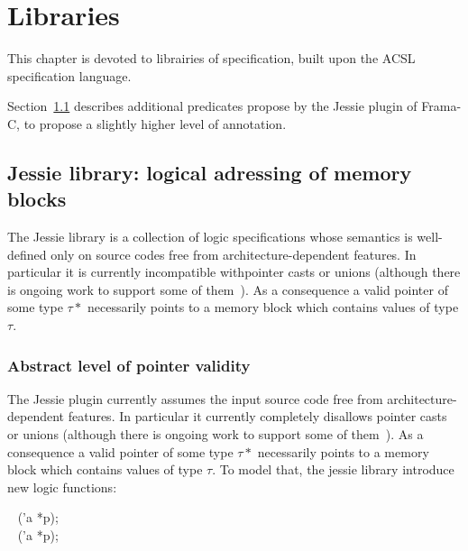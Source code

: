 \chapter{Libraries}
\label{chap:lib}

This chapter is devoted to librairies of specification, built upon the ACSL specification language.

Section~\ref{sec:jessie} describes additional predicates propose by the Jessie plugin of Frama-C, to propose a slightly higher level of annotation.


%

\section{Jessie library: logical adressing of memory blocks}
\label{sec:jessie}


The Jessie library is a collection of logic specifications whose
semantics is well-defined only on source codes free from
architecture-dependent features. In particular it is currently
incompatible withpointer casts or unions (although there is ongoing
work to support some of them~\cite{moy07ccpp}). As a consequence a
valid pointer of some type $\tau*$ necessarily points to a memory
block which contains values of type $\tau$.

\subsection{Abstract level of pointer validity}

The Jessie plugin currently assumes the input source code free from
architecture-dependent features. In particular it currently completely
disallows pointer casts or unions (although there is ongoing work to
support some of them~\cite{moy07ccpp}). As a consequence a valid
pointer of some type $\tau*$ necessarily points to a memory block
which contains values of type $\tau$. To model that, the jessie library introduce new logic functions:
\begin{flushleft}
\integer ~ \offsetmin('a *p); \\
\integer ~ \offsetmax('a *p);
\end{flushleft}

